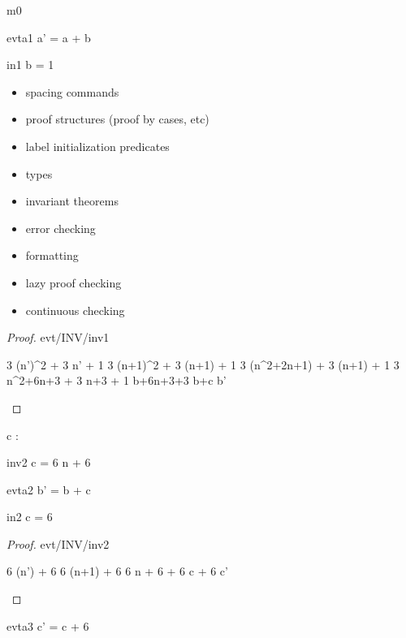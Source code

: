 \documentclass[12pt]{amsart}
\begin{document}
\begin{machine}{m0}
\begin{evassignment}{evt}{a1}
	a' = a + b
\end{evassignment}

\begin{initialization}{in1}
	b = 1
\end{initialization}

\begin{itemize}
\item spacing commands
\item proof structures (proof by cases, etc)
\item label initialization predicates
\item types
\item invariant theorems
\item error checking
\item formatting
\item lazy proof checking
\item continuous checking
\end{itemize}

\begin{proof}{evt/INV/inv1}
	\begin{calculation}
		3 \cdot (n')^2 + 3 \cdot n' + 1
	\hint{=}{ \ref{a0} }
		3 \cdot (n+1)^2 + 3 \cdot (n+1) + 1
		3 \cdot (n^2+2\cdot n+1) + 3 \cdot (n+1) + 1
		3 \cdot n^2+6\cdot n+3 + 3 \cdot n+3 + 1
	\hint{=}{ \ref{inv1} }
		b+6\cdot n+3+3
	\hint{=}{ \ref{inv2} }
		b+c
	\hint{=}{ \ref{a2} }
		b'
	\end{calculation}
\end{proof}

\begin{variable}
	c : \Int
\end{variable}

\begin{invariant}{inv2}
	c = 6 \cdot n + 6
\end{invariant}

\begin{evassignment}{evt}{a2}
	b' = b + c
\end{evassignment}

\begin{initialization}{in2}
	c = 6
\end{initialization}

\begin{proof}{evt/INV/inv2}
	\begin{calculation}
		6 \cdot (n') + 6
	\hint{=}{ \ref{a0} }
		6 \cdot (n+1) + 6
	\hint{=}{ arithmetic }
		6 \cdot n + 6 + 6
	\hint{=}{ \ref{inv2} }
		c + 6
	\hint{=}{ \ref{a3} }
		c'
	\end{calculation}
\end{proof}

\begin{evassignment}{evt}{a3}
	c' = c + 6
\end{evassignment}

\end{machine}
\end{document}
